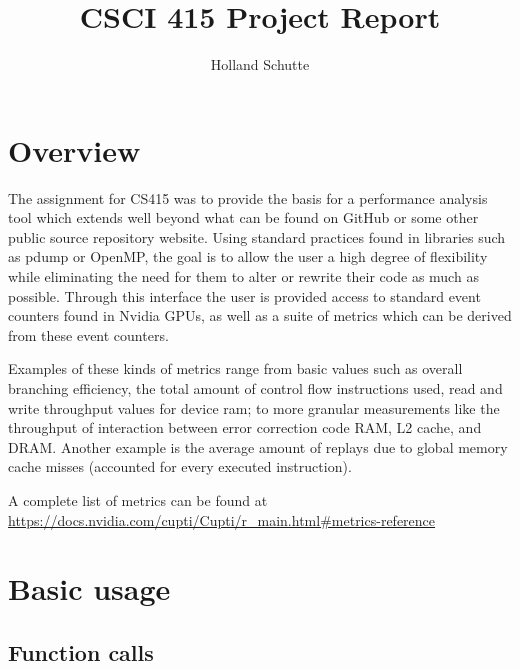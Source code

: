 \documentclass[8pt, a4paper, twoside, twoclumn, english]{extreport}
\begin{document}
\title{CSCI 415 Project Report}
\author{Holland Schutte}
\maketitle


\onecolumn

\section{Overview}

\begin{flushleft}
  The assignment for CS415 was to provide the basis for a performance analysis tool which extends
  well beyond what can be found on GitHub or some other public source repository website. Using
  standard practices found in libraries such as pdump or OpenMP,
  the goal is to allow the user a high degree of flexibility while eliminating
  the need for them to alter or rewrite their code as much as possible. Through this interface
  the user is provided access to standard event counters found in Nvidia GPUs, as well as a
  suite of metrics which can be derived from these event counters.
\end{flushleft}

\begin{flushleft}
  Examples of these kinds of metrics range from basic values such as overall branching efficiency,
  the total amount of control flow instructions used,
  read and write throughput values for device ram; to more granular measurements like the throughput of
  interaction between error correction code RAM, L2 cache, and DRAM. Another example is the average
  amount of replays due to global memory cache misses (accounted for every executed instruction).
\end{flushleft}

\begin{flushleft}
A complete list of metrics can be found at \url{https://docs.nvidia.com/cupti/Cupti/r_main.html#metrics-reference}
\end{flushleft}

\section {Basic usage}

\subsection{Function calls}
\end{document}
